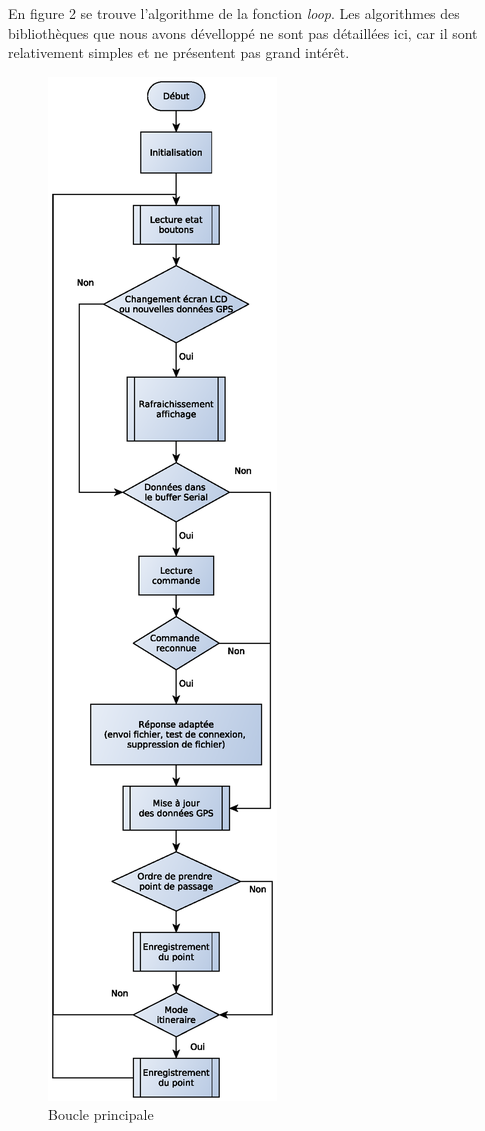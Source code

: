 \documentclass[a4paper,12pt]{article}
\begin{document}
En figure 2 se trouve l'algorithme de la fonction \textit{loop}. Les algorithmes des bibliothèques que nous avons dévelloppé ne sont pas détaillées ici, car il sont relativement simples et ne présentent pas grand intérêt.
\newpage
\begin{figure}[!ht]
	\begin{center}
		
		\includegraphics[scale = 0.5]{MainAlgoGraph.eps}
		\caption{Boucle principale}
	\end{center}
\end{figure}
\FloatBarrier
\newpage
\end{document}
